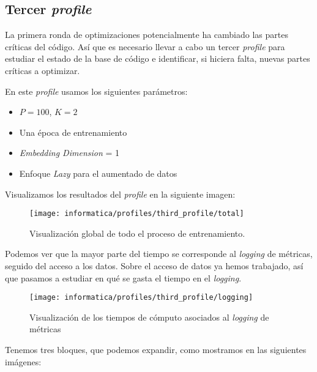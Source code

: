 \subsection{Tercer \textit{profile}}

La primera ronda de optimizaciones potencialmente ha cambiado las partes críticas del código. Así que es necesario llevar a cabo un tercer \textit{profile} para estudiar el estado de la base de código e identificar, si hiciera falta, nuevas partes críticas a optimizar.

En este \textit{profile} usamos los siguientes parámetros:

\begin{itemize}
    \item $P = 100$, $K = 2$
    \item Una época de entrenamiento
    \item \textit{Embedding Dimension} = 1
    \item Enfoque \textit{Lazy} para el aumentado de datos
\end{itemize}

Visualizamos los resultados del \textit{profile} en la siguiente imagen:

\begin{figure}[H]
    \centering
    \texttt{[image: informatica/profiles/third\_profile/total]}
    \caption{Visualización global de todo el proceso de entrenamiento.}
\end{figure}

Podemos ver que la mayor parte del tiempo se corresponde al \textit{logging} de métricas, seguido del acceso a los datos. Sobre el acceso de datos ya hemos trabajado, así que pasamos a estudiar en qué se gasta el tiempo en el \textit{logging}.


\begin{figure}[H]
    \centering
    \texttt{[image: informatica/profiles/third\_profile/logging]}
    \caption{Visualización de los tiempos de cómputo asociados al \textit{logging} de métricas}
\end{figure}

Tenemos tres bloques, que podemos expandir, como mostramos en las siguientes imágenes:

